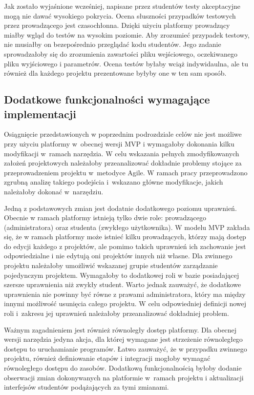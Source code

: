Jak zostało wyjaśnione wcześniej, napisane przez studentów testy akceptacyjne mogą nie dawać wysokiego pokrycia.
Ocena słuszności przypadków testowych przez prowadzącego jest czasochłonna.
Dzięki użyciu platformy prowadzący miałby wgląd do testów na wysokim poziomie.
Aby zrozumieć przypadek testowy, nie musiałby on bezepośrednio przeglądać kodu studentów.
Jego zadanie sprowadzałoby się do zrozumienia zawartości pliku wejściowego, oczekiwanego pliku wyjściowego i parametrów.
Ocena testów byłaby wciąż indywidaulna, ale tu również dla każdego projektu prezentowane byłyby one w ten sam sposób.

\subsection{Dodatkowe funkcjonalności wymagające implementacji}
\label{agile_todo}

Osiągnięcie przedstawionych w poprzednim podrozdziale celów nie jest możliwe przy użyciu platformy w~obecnej wersji MVP i wymagałoby dokonania kilku modyfikacji w~ramach narzędzia.
W celu wskazania pełnych zmodyfikowanych założeń projektowych należałoby przeanalizować dokładnie problemy stojące za przeprowadzeniem projektu w~metodyce Agile.
W ramach pracy przeprowadzono zgrubną analizę takiego podejścia i~wskazano główne modyfikacje, jakich należałoby dokonać w~narzędziu.

Jedną z podstawowych zmian jest dodatnie dodatkowego poziomu uprawnień.
Obecnie w ramach platformy istnieją tylko dwie role: prowadzącego (administratora) oraz studenta (zwykłego użytkownika).
W modelu MVP zakłada się, że w ramach platformy może istnieć kilku prowadzących, którzy mają dostęp do edycji każdego z projektów, ale pomimo takich uprawnień ich zachowanie jest odpowiedzialne i nie edytują oni projektów innych niż własne.
Dla zwinnego projektu należałoby umożliwić wskazanej grupie studentów zarządzanie pojedynczym projektem.
Wymagałoby to dodatkowej roli w bazie posiadającej szersze uprawnienia niż zwykły student.
Warto jednak zauważyć, że dodatkowe uprawnienia nie powinny być równe z prawami administratora, który ma między innymi możliwość usunięcia całego projektu.
W celu odpowiedniej definicji nowej roli i~zakresu jej uprawnień należałoby przeanalizować dokładniej problem.

Ważnym zagadnieniem jest również równoległy dostęp platformy.
Dla obecnej wersji narzędzia jedyna akcja, dla której wymagane jest strzeżenie równoległego dostępu to uruchamianie programów.
Łatwo zauważyć, że w przypadku zwinnego projektu, również definiowanie etapów i integracji mogłoby wymagać równoległego dostępu do zasobów.
Dodatkową funkcjonalnością byłoby dodanie obserwacji zmian dokonywanych na platformie w~ramach projektu i aktualizacji interfejsów studentów podążających za tymi zmianami.


